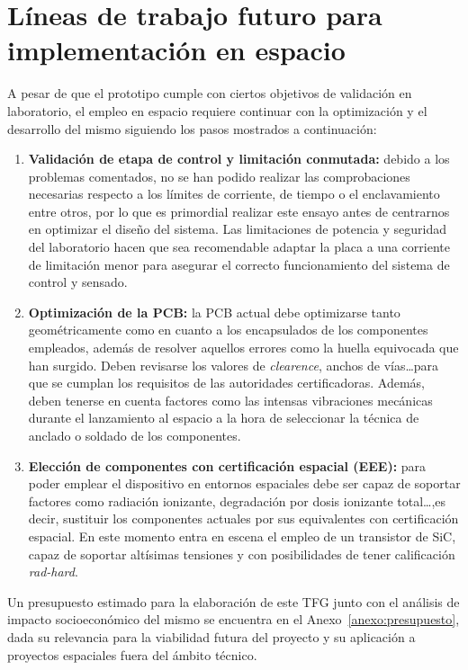 \documentclass[12pt]{report} %
\begin{document}
\section{Líneas de trabajo futuro para implementación en espacio}
\label{sec:trabajo_futuro}
A pesar de que el prototipo cumple con ciertos objetivos de validación en laboratorio, el empleo en espacio requiere continuar con la optimización y el desarrollo del mismo siguiendo los pasos mostrados a continuación:
\begin{enumerate}[label=\arabic*°.]
    \item \textbf{Validación de etapa de control y limitación conmutada:} debido a los problemas comentados, no se han podido realizar las comprobaciones necesarias respecto a los límites de corriente, de tiempo o el enclavamiento entre otros, por lo que es primordial realizar este ensayo antes de centrarnos en optimizar el diseño del sistema. Las limitaciones de potencia y seguridad del laboratorio hacen que sea recomendable adaptar la placa a una corriente de limitación menor para asegurar el correcto funcionamiento del sistema de control y sensado. 
    \item \textbf{Optimización de la PCB:} la PCB actual debe optimizarse tanto geométricamente como en cuanto a los encapsulados de los componentes empleados, además de resolver aquellos errores como la huella equivocada que han surgido. Deben revisarse los valores de \textit{clearence}, anchos de vías\dots para que se cumplan los requisitos de las autoridades certificadoras. Además, deben tenerse en cuenta factores como las intensas vibraciones mecánicas durante el lanzamiento al espacio a la hora de seleccionar la técnica de anclado o soldado de los componentes.  
    \item \textbf{Elección de componentes con certificación espacial (EEE):} para poder emplear el dispositivo en entornos espaciales debe ser capaz de soportar factores como radiación ionizante, degradación por dosis ionizante total\dots ,es decir, sustituir los componentes actuales por sus equivalentes con certificación espacial. En este momento entra en escena el empleo de un transistor de SiC, capaz de soportar altísimas tensiones y con posibilidades de tener calificación \textit{rad-hard}.
\end{enumerate}
Un presupuesto estimado para la elaboración de este TFG junto con el análisis de impacto socioeconómico del mismo se encuentra en el Anexo~\ref{anexo:presupuesto}, dada su relevancia para la viabilidad futura del proyecto y su aplicación a proyectos espaciales fuera del ámbito técnico.
\end{document}
